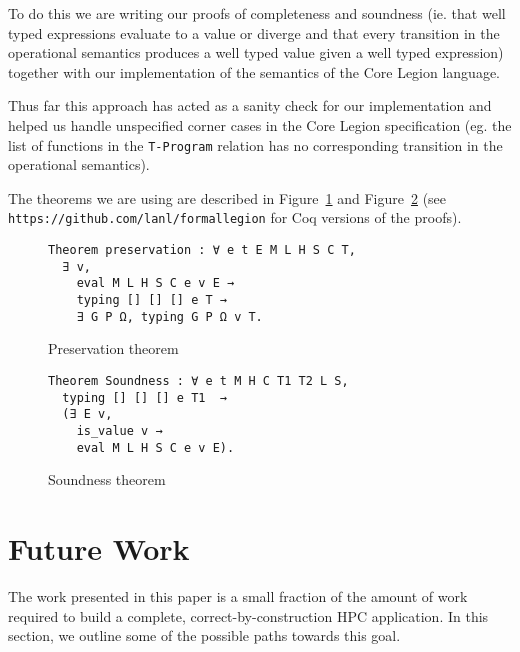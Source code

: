 \documentclass[sigconf]{acmart}
\begin{document}
To do this we are writing our proofs of completeness and soundness (ie. that well
typed expressions evaluate to a value or diverge and that every transition in
the operational semantics produces a well typed value given a well typed
expression) together with our implementation of the semantics of the Core
Legion language.

Thus far this approach has acted as a sanity check for our implementation and
helped us handle unspecified corner cases in the Core Legion specification (eg.
the list of functions in the \texttt{T-Program} relation has no corresponding
transition in the operational semantics). 

The theorems we are using are described in Figure~\ref{preservationtheorem} and
Figure~\ref{soundnesstheorem} (see \texttt{https://github.com/lanl/formallegion}
for Coq versions of the proofs). 

\begin{figure}
\begin{BVerbatim}
Theorem preservation : ∀ e t E M L H S C T,
  ∃ v,
    eval M L H S C e v E →
    typing [] [] [] e T → 
    ∃ G P Ω, typing G P Ω v T.
\end{BVerbatim}
\caption{Preservation theorem}
\label{preservationtheorem}
\end{figure}

\begin{figure}
\begin{BVerbatim}
Theorem Soundness : ∀ e t M H C T1 T2 L S,
  typing [] [] [] e T1  →
  (∃ E v,
    is_value v →
    eval M L H S C e v E).
\end{BVerbatim}
\caption{Soundness theorem}
\label{soundnesstheorem}
\end{figure}

\section{Future Work}

The work presented in this paper is a small fraction of the amount of work
required to build a complete, correct-by-construction HPC application. In this
section, we outline some of the possible paths towards this goal. 
\end{document}
